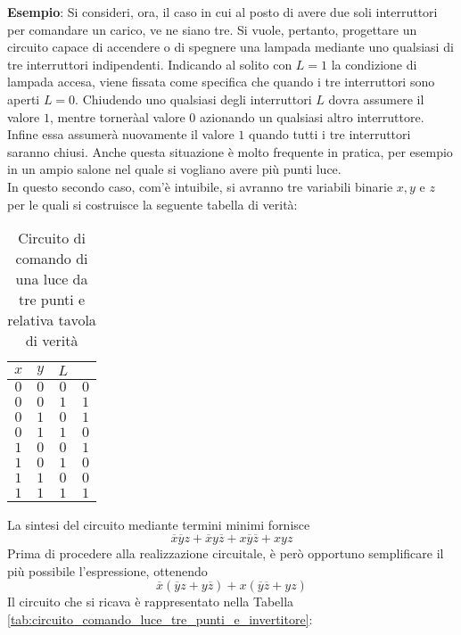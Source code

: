 \documentclass[a4paper]{extarticle}
\begin{document}
\vspace{1em}
\noindent
\textbf{Esempio}: Si consideri, ora, il caso in cui al posto di avere due soli interruttori per comandare un carico, ve ne siano tre. Si vuole, pertanto, progettare un circuito capace di accendere o di spegnere una lampada mediante uno qualsiasi di tre interruttori indipendenti. Indicando al solito con $L = 1$ la condizione di lampada accesa, viene fissata come specifica che quando i tre interruttori sono aperti $L = 0$. Chiudendo uno qualsiasi degli interruttori $L$ dovra assumere il valore $1$, mentre torneràal valore $0$ azionando un qualsiasi altro interruttore. Infine essa assumerà nuovamente il valore $1$ quando tutti i tre interruttori saranno chiusi. Anche questa situazione è molto frequente in pratica, per esempio in un ampio salone nel quale si vogliano avere più punti luce.\\
In questo secondo caso, com'è intuibile, si avranno tre variabili binarie \(x, y\) e \(z\) per le quali si costruisce la seguente tabella di verità:

\begin{table}[H]
    \centering
    \begin{tabular}{ccc|c}
         \(x\) & \(y\) & \(L\)\\
         \hline
         \(0\) & \(0\) & \(0\) & \(0\)\\
         \(0\) & \(0\) & \(1\) & \(1\)\\
         \(0\) & \(1\) & \(0\) & \(1\)\\
         \(0\) & \(1\) & \(1\) & \(0\)\\
         \(1\) & \(0\) & \(0\) & \(1\)\\
         \(1\) & \(0\) & \(1\) & \(0\)\\
         \(1\) & \(1\) & \(0\) & \(0\)\\
         \(1\) & \(1\) & \(1\) & \(1\)\\
    \end{tabular}
    \caption{Circuito di comando di una luce da tre punti e relativa tavola di verità}
    \label{tab:circuito_luce_tre_punti_tavola_verita}
\end{table}

\noindent
La sintesi del circuito mediante termini minimi fornisce
\[\overline{x} \overline{y} z + \overline{x} y \overline{z} + x \overline{y} \overline{z} + xyz\]
Prima di procedere alla realizzazione circuitale, è però opportuno semplificare il più possibile l'espressione, ottenendo
\[\overline{x} (\overline{y}z + y \overline{z}) + x (\overline{y} \overline{z} + yz)\]
Il circuito che si ricava è rappresentato nella Tabella \ref{tab:circuito_comando_luce_tre_punti_e_invertitore}:
\end{document}
